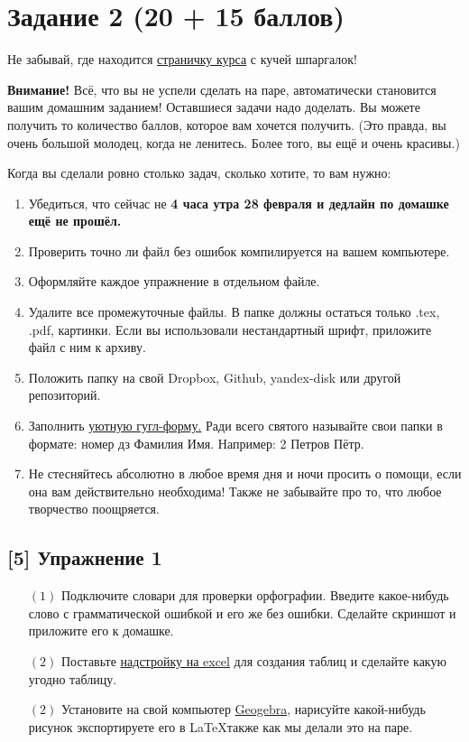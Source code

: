 \documentclass[12pt, a4paper, oneside]{article}
\begin{document}
\section*{Задание 2  (20 + 15 баллов)}

Не забывай, где находится  \href{https://fulyankin.github.io/LaTeX/}{страничку курса} с кучей шпаргалок!

\textbf{Внимание!} Всё, что вы не успели сделать на паре, автоматически становится вашим домашним заданием! Оставшиеся задачи надо доделать. Вы можете получить то количество баллов, которое вам хочется получить. (Это правда, вы очень большой молодец, когда не ленитесь. Более того, вы ещё и очень красивы.) 

Когда вы сделали ровно столько задач, сколько хотите, то вам нужно:

\begin{enumerate}
\item Убедиться, что сейчас не \textbf{4 часа утра 28 февраля и дедлайн по домашке ещё не прошёл.}
\item Проверить точно ли файл без ошибок компилируется на вашем компьютере.
\item Оформляйте каждое упражнение в отдельном файле.
\item Удалите все промежуточные файлы. В папке должны остаться только .tex, .pdf, картинки. Если вы использовали нестандартный шрифт, приложите файл с ним к архиву.
\item Положить папку на	свой	Dropbox, Github,	yandex-disk	или другой	репозиторий.
\item Заполнить	\href{https://docs.google.com/forms/d/e/1FAIpQLSe11kxKVfv07iCL1E9yNX7ll9swKImiVwRr1H70lslGzInRSg/viewform}{уютную гугл-форму.} Ради всего святого называйте свои папки в формате: номер дз Фамилия Имя. Например: 2 Петров Пётр.
\item Не стесняйтесь абсолютно в любое время дня и ночи просить о помощи, если она вам действительно необходима! Также не забывайте про то, что любое творчество поощряется. 
\end{enumerate}

\subsection*{[5]  Упражнение 1 }

\begin{itemize}
	\item[$(1)$]  Подключите словари для проверки орфографии. Введите какое-нибудь слово с грамматической ошибкой и его же без ошибки. Сделайте скриншот и приложите его к домашке. 
	\item [$(2)$]  Поставьте \href{https://www.ctan.org/pkg/excel2latex}{надстройку на excel} для создания таблиц и сделайте какую угодно таблицу. 
	\item[$(2)$]  Установите на свой компьютер \href{https://www.geogebra.org/download}{Geogebra}, нарисуйте какой-нибудь рисунок экспортируете его в \LaTeX также как мы делали это на паре. 
\end{itemize}
\end{document}
